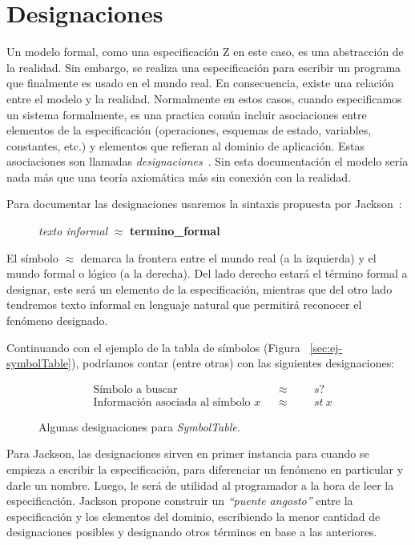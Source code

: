 \chapter{Designaciones}

Un modelo formal, como una especificación Z en este caso, es una abstracción de la realidad. Sin embargo, se realiza una especificación para escribir un programa que finalmente es usado en el mundo real. En consecuencia, existe una relación entre el modelo y la realidad.
Normalmente en estos casos, cuando especificamos un sistema formalmente, es una practica común incluir asociaciones entre elementos de la especificación (operaciones, esquemas de estado, variables, constantes, etc.) y elementos que refieran al dominio de aplicación. Estas asociaciones son llamadas \emph{designaciones}~\cite{jackson}.
Sin esta documentación el modelo sería nada más que una teoría axiomática más sin conexión con la realidad. 

Para documentar las designaciones usaremos la sintaxis propuesta por Jackson~\cite{jackson}:

\begin{figure}[H]
  \centering
  \emph{texto informal} $\approx$ \textbf{termino\_formal}
\end{figure}

El símbolo $\approx$ demarca la frontera entre el mundo real (a la izquierda) y el mundo formal o lógico (a la derecha). Del lado derecho estará el término formal a designar, este será un elemento de la especificación, mientras que del otro lado tendremos texto informal en lenguaje natural que permitirá reconocer el fenómeno designado.

Continuando con el ejemplo de la tabla de símbolos (Figura ~\ref{sec:ej-symbolTable}), podríamos contar (entre otras) con las siguientes designaciones:

\begin{figure}[H]
  \begin{align*} 
    &\text{Símbolo a buscar} && \approx &&&s? \\
    &\text{Información asociada al símbolo $x$} && \approx &&&st~x
  \end{align*}
  \caption{Algunas designaciones para \emph{SymbolTable}.}
  \label{fig:ej_designacion}
\end{figure}


Para Jackson, las designaciones sirven en primer instancia para cuando se empieza a escribir la especificación, para diferenciar un fenómeno en particular y darle un nombre. Luego, le será de utilidad al programador a la hora de leer la especificación. Jackson propone construir un \emph{``puente angosto''} entre la especificación y los elementos del dominio, escribiendo la menor cantidad de designaciones posibles y designando otros términos en base a las anteriores.


